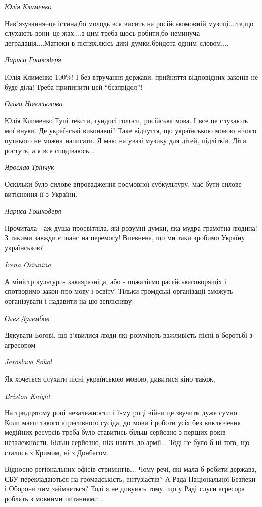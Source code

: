 \emph{Юлія Клименко}

Нав"язування--це істина,бо молодь вся висить на російськомовній музиці....те,що
слухають вони--це жах....з цим треба щось робити,бо неминуча
деградація....Матюки в піснях,якісь дикі думки,бридота одним словом....

\emph{Лариса Гошкодеря}

Юлія Клименко 100\%! І без втручання держави, прийняття відповідних законів не
буде діла! Треба припинити цей \enquote{бєзпрідєл}!

\emph{Ольга Новосьолова}

Юлія Клименко Тупі тексти, гундосі голоси, російська мова. І все це слухають
мої внуки. Де українські виконавці? Таке відчуття, що українською мовою нічого
путнього не можна написати. Я маю на увазі музику для дітей, підлітків. Діти
ростуть, а я все сподіваюсь...

\emph{Ярослав Трінчук}

Оскільки було силове впровадження росмовної субкультуру, має бути силове витіснення її з України.

\emph{Лариса Гошкодеря}

Прочитала - аж душа просвітліла, які розумні думки, яка мудра грамотна людина!
З такими завжди є шанс на перемогу! Впевнена, що ми таки зробимо Україну
українською!

\emph{Irena Osiunina}

А міністр культури- какаяразніца, або - пожаліємо расєйськаговорящіх і спотворимо закон про мову і освіту! Тільки громдські організаціі зможуть організувати і надавити на цю зеплісняву.

\emph{Олег Дулембов}

Дякувати Богові, що з'явилися люди які розуміють важливість пісні в боротьбі з агресором

\emph{Jaroslava Sokol}

Як хочеться слухати пісні українською мовою, дивитися кіно також,

\emph{Briston Knight}

На тридцятому році незалежности і 7-му році війни це звучить дуже сумно... Коли
маєш такого агресивного сусіда, до мови і роботи усіх без виключення медійних
ресурсів треба було ставитись більш серйозно з перших років незалежности. Більш
серйозно, ніж навіть до армії... Тоді не було б ні того, що сталось з Кримом,
ні з Донбасом.

Відносно регіональних офісів стримінгів... Чому речі, які мала б робити
держава, СБУ перекладаються на громадськість, ентузіастів? А Рада Національної
Безпеки і Оборони чим займається? Тоді я не дивуюсь тому, що у Раді слуги
агресора роблять з мовними питаннями...


